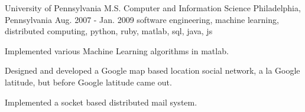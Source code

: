 \cventry
    {University of Pennsylvania} %
    {M.S. Computer and Information Science} %
    {Philadelphia, Pennsylvania} %
    {Aug. 2007 - Jan. 2009} %
    {software engineering, machine learning, distributed computing, python, ruby, matlab, sql, java, js} %
    {
        \vspace{-4.0mm}
        \begin{cvitems} %
        \item {Implemented various Machine Learning algorithms in matlab. }
        \item {Designed and developed a Google map based location social network, a la Google latitude, but before Google latitude came out.
        }
        \item {Implemented a socket based distributed mail system.}
        \end{cvitems}
    }
